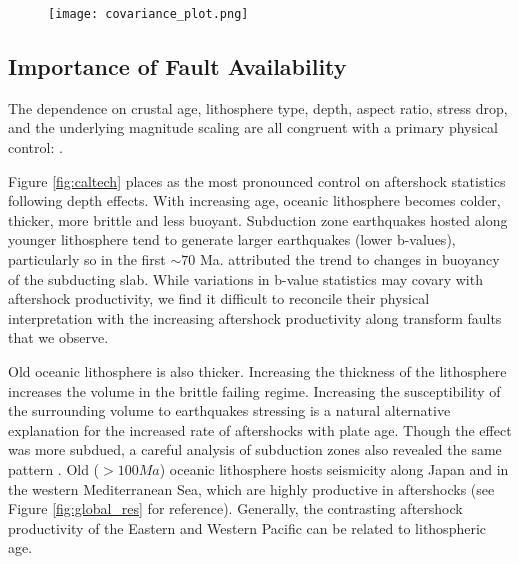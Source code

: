 \documentclass[draft, jgrga]{agujournal2018}
\begin{document}
 \begin{figure}
    \centering
    \texttt{[image: covariance\_plot.png]}
    \caption{}
    \label{fig:covariance}
\end{figure}

\subsection{Importance of Fault Availability}

The dependence on crustal age, lithosphere type, depth, aspect ratio, stress drop, and the underlying magnitude scaling are all congruent with a primary physical control: . 

 Figure \ref{fig:caltech} places  as the most pronounced control on aftershock statistics following depth effects. With increasing age, oceanic lithosphere becomes colder, thicker, more brittle and less buoyant. Subduction zone earthquakes hosted along younger lithosphere tend to generate larger earthquakes (lower b-values), particularly so in the first $\sim70$ Ma. \citet{Nishikawa2014EarthquakeBuoyancy} attributed the trend to changes in buoyancy of the subducting slab. While variations in b-value statistics may covary with aftershock productivity, we find it difficult to reconcile their physical interpretation with the increasing aftershock productivity along transform faults that we observe.

Old oceanic lithosphere is also thicker. Increasing the thickness of the lithosphere increases the volume in the brittle failing regime. Increasing the susceptibility of the surrounding volume to earthquakes stressing is a natural alternative explanation for the increased rate of aftershocks with plate age. Though the effect was more subdued, a careful analysis of subduction zones also revealed the same pattern \citep[Appendix of][]{Wetzler2016}. Old ($>100Ma$) oceanic lithosphere hosts seismicity along Japan and in the western Mediterranean Sea, which are highly productive in aftershocks (see Figure \ref{fig:global_res} for reference). Generally, the contrasting aftershock productivity of the Eastern and Western Pacific can be related to lithospheric age.
\end{document}
